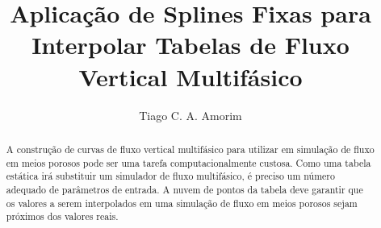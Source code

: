 \documentclass[final,5p]{elsarticle}
\numberwithin{equation}{section}
\begin{document}
\begin{frontmatter}



\title{Aplicação de Splines Fixas para Interpolar Tabelas de Fluxo Vertical Multifásico}


\author{Tiago C. A. Amorim}

\begin{abstract}

    A construção de curvas de fluxo vertical multifásico para utilizar em simulação de fluxo em meios porosos pode ser uma tarefa computacionalmente custosa. Como uma tabela estática irá substituir um simulador de fluxo multifásico, é preciso um número adequado de parâmetros de entrada. A nuvem de pontos da tabela deve garantir que os valores a serem interpolados em uma simulação de fluxo em meios porosos sejam próximos dos valores reais.


\end{abstract}
\end{frontmatter}
\end{document}
